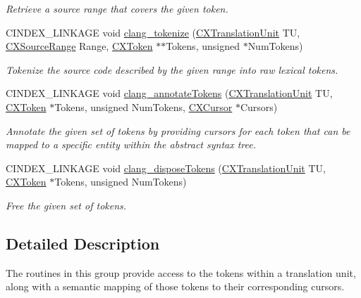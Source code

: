 \begin{DoxyCompactItemize}
\begin{DoxyCompactList}\small\item\em Retrieve a source range that covers the given token. \end{DoxyCompactList}\item 
C\+I\+N\+D\+E\+X\+\_\+\+L\+I\+N\+K\+A\+GE void \hyperlink{group__CINDEX__LEX_ga6b315a71102d4f6c95eb68894a3bda8a}{clang\+\_\+tokenize} (\hyperlink{group__CINDEX_gacdb7815736ca709ce9a5e1ec2b7e16ac}{C\+X\+Translation\+Unit} TU, \hyperlink{structCXSourceRange}{C\+X\+Source\+Range} Range, \hyperlink{structCXToken}{C\+X\+Token} $\ast$$\ast$Tokens, unsigned $\ast$Num\+Tokens)
\begin{DoxyCompactList}\small\item\em Tokenize the source code described by the given range into raw lexical tokens. \end{DoxyCompactList}\item 
C\+I\+N\+D\+E\+X\+\_\+\+L\+I\+N\+K\+A\+GE void \hyperlink{group__CINDEX__LEX_gadc0c15904e61902b73e02700af0863a0}{clang\+\_\+annotate\+Tokens} (\hyperlink{group__CINDEX_gacdb7815736ca709ce9a5e1ec2b7e16ac}{C\+X\+Translation\+Unit} TU, \hyperlink{structCXToken}{C\+X\+Token} $\ast$Tokens, unsigned Num\+Tokens, \hyperlink{structCXCursor}{C\+X\+Cursor} $\ast$Cursors)
\begin{DoxyCompactList}\small\item\em Annotate the given set of tokens by providing cursors for each token that can be mapped to a specific entity within the abstract syntax tree. \end{DoxyCompactList}\item 
\mbox{\label{group__CINDEX__LEX_gac5266f6b5fee87c433b696437cab0d13}} 
C\+I\+N\+D\+E\+X\+\_\+\+L\+I\+N\+K\+A\+GE void \hyperlink{group__CINDEX__LEX_gac5266f6b5fee87c433b696437cab0d13}{clang\+\_\+dispose\+Tokens} (\hyperlink{group__CINDEX_gacdb7815736ca709ce9a5e1ec2b7e16ac}{C\+X\+Translation\+Unit} TU, \hyperlink{structCXToken}{C\+X\+Token} $\ast$Tokens, unsigned Num\+Tokens)
\begin{DoxyCompactList}\small\item\em Free the given set of tokens. \end{DoxyCompactList}\end{DoxyCompactItemize}


\subsection{Detailed Description}
The routines in this group provide access to the tokens within a translation unit, along with a semantic mapping of those tokens to their corresponding cursors. 

